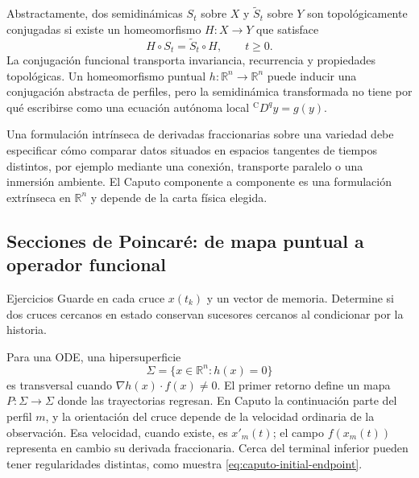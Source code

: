 Abstractamente, dos semidinámicas \(S_t\) sobre \(X\) y \(\widetilde S_t\)
sobre \(Y\) son topológicamente conjugadas si existe un homeomorfismo
\(H:X\to Y\) que satisface
\begin{equation}
 H\circ S_t=\widetilde S_t\circ H,
 \qquad t\geq0.
 \label{eq:geofo-topological-conjugacy}
\end{equation}
La conjugación funcional transporta invariancia, recurrencia y propiedades
topológicas. Un homeomorfismo puntual
\(h:\mathbb R^n\to\mathbb R^n\) puede inducir una conjugación abstracta de
perfiles, pero la semidinámica transformada no tiene por qué escribirse como
una ecuación autónoma local \({}^{\mathrm C}D^qy=g(y)\).

\begin{remark}
Una formulación intrínseca de derivadas fraccionarias sobre una variedad debe
especificar cómo comparar datos situados en espacios tangentes de tiempos
distintos, por ejemplo mediante una conexión, transporte paralelo o una
inmersión ambiente. El Caputo componente a componente es una formulación
extrínseca en \(\mathbb R^n\) y depende de la carta física elegida.
\end{remark}

\subsection{Secciones de Poincaré: de mapa puntual a operador funcional}

\ifHAFOPedagogy
\begin{bloqueestudio}{Ejercicios}
Guarde en cada cruce \(x(t_k)\) y un vector de memoria. Determine si dos cruces
cercanos en estado conservan sucesores cercanos al condicionar por la historia.
\end{bloqueestudio}
\fi

Para una ODE, una hipersuperficie
\begin{equation}
 \Sigma=\{x\in\mathbb R^n:h(x)=0\}
 \label{eq:geofo-point-section}
\end{equation}
es transversal cuando \(\nabla h(x)\cdot f(x)\neq0\). El primer retorno define
un mapa \(P:\Sigma\to\Sigma\) donde las trayectorias regresan. En Caputo
la continuación parte del perfil \(m\), y la orientación del cruce depende
de la velocidad ordinaria de la observación. Esa velocidad, cuando existe,
es \(x'_m(t)\); el campo \(f(x_m(t))\) representa en cambio su derivada
fraccionaria. Cerca del terminal inferior pueden tener regularidades
distintas, como muestra \cref{eq:caputo-initial-endpoint}.

